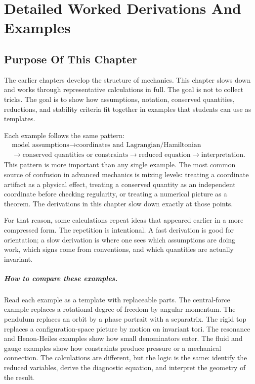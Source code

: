 \chapter{Detailed Worked Derivations And Examples}
\label{chap:detailed-worked-derivations}

\section{Purpose Of This Chapter}
\label{sec:detailed-purpose}

The earlier chapters develop the structure of mechanics. This chapter slows
down and works through representative calculations in full. The goal is not to
collect tricks. The goal is to show how assumptions, notation, conserved
quantities, reductions, and stability criteria fit together in examples that
students can use as templates.

Each example follows the same pattern:
\[
\begin{gathered}
  \text{model assumptions}
  \longrightarrow
  \text{coordinates and Lagrangian/Hamiltonian}\\
  \longrightarrow
  \text{conserved quantities or constraints}
  \longrightarrow
  \text{reduced equation}
  \longrightarrow
  \text{interpretation}.
\end{gathered}
\]
This pattern is more important than any single example. The most common source
of confusion in advanced mechanics is mixing levels: treating a coordinate
artifact as a physical effect, treating a conserved quantity as an independent
coordinate before checking regularity, or treating a numerical picture as a
theorem. The derivations in this chapter slow down exactly at those points.

For that reason, some calculations repeat ideas that appeared earlier in a more
compressed form. The repetition is intentional. A fast derivation is good for
orientation; a slow derivation is where one sees which assumptions are doing
work, which signs come from conventions, and which quantities are actually
invariant.

\paragraph{How to compare these examples.}
Read each example as a template with replaceable parts. The central-force
example replaces a rotational degree of freedom by angular momentum. The
pendulum replaces an orbit by a phase portrait with a separatrix. The rigid top
replaces a configuration-space picture by motion on invariant tori. The
resonance and Henon-Heiles examples show how small denominators enter. The
fluid and gauge examples show how constraints produce pressure or a mechanical
connection. The calculations are different, but the logic is the same: identify
the reduced variables, derive the diagnostic equation, and interpret the
geometry of the result.

